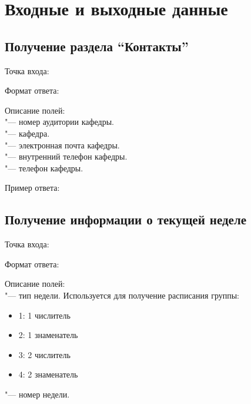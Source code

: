 \chapter{Входные и выходные данные}
\label{ch:io}

\section{Получение раздела ``Контакты''}
\label{sec:contacts}

Точка входа: 

Формат ответа:
\begin{listing}[H]
\end{listing}
\vspace{-0.75cm}

Описание полей:\\
 "--- номер аудитории кафедры.\\
 "--- кафедра.\\
 "--- электронная почта кафедры.\\
 "--- внутренний телефон кафедры.\\
 "--- телефон кафедры.

Пример ответа:
\begin{listing}[H]
\end{listing}
\vspace{-0.75cm}

\section{Получение информации о текущей неделе}
\label{sec:faq}

Точка входа: 

Формат ответа:
\begin{listing}[H]
\end{listing}
\vspace{-0.75cm}

Описание полей:\\
 "--- тип недели.
Используется для получение расписания группы:
\begin{itemize}
  \item 1: 1 числитель
  \item 2: 1 знаменатель
  \item 3: 2 числитель
  \item 4: 2 знаменатель
\end{itemize}
 "--- номер недели.

